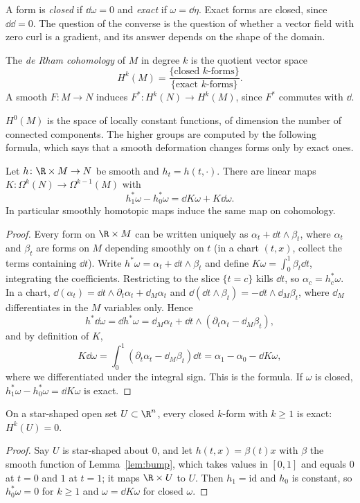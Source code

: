 A form is \emph{closed} if $\dd\omega=0$ and \emph{exact} if $\omega=\dd\eta$. Exact forms are closed, since $\dd\dd=0$. The question of the converse is the question of
whether a vector field with zero curl is a gradient, and its answer depends on the shape of the domain.

\begin{definition}
The \emph{de Rham cohomology} of $M$ in degree $k$ is the quotient vector space
\[H^k(M)=\frac{\{\text{closed }k\text{-forms}\}}{\{\text{exact }k\text{-forms}\}}.\] A smooth $F\colon M\to N$ induces
$F^*\colon H^k(N)\to H^k(M)$, since $F^*$ commutes with $\dd$.
\end{definition}

$H^0(M)$ is the space of locally constant functions, of dimension the number of connected components. The higher groups are computed by the following
formula, which says that a smooth deformation changes forms only by exact ones.

\begin{theorem}\label{thm:homotopy}
Let $h\colon\R\times M\to N$ be smooth and $h_t=h(t,\cdot)$. There are linear maps $K\colon\Omega^k(N)\to\Omega^{k-1}(M)$ with
\[
h_1^*\omega-h_0^*\omega=\dd K\omega+K\dd\omega.
\]
In particular smoothly homotopic maps induce the same map on cohomology.
\end{theorem}
\begin{proof}
Every form on $\R\times M$ can be written uniquely as $\alpha_t+\dd t\wedge\beta_t$, where $\alpha_t$ and $\beta_t$ are forms on $M$ depending smoothly on $t$ (in a chart
$(t,x)$, collect the terms containing $\dd t$). Write $h^*\omega=\alpha_t+\dd t\wedge\beta_t$ and define $K\omega=\int_0^1\beta_t\dd t$, integrating the coefficients. Restricting to
the slice $\{t=c\}$ kills $\dd t$, so $\alpha_c=h_c^*\omega$. In a chart, $\dd(\alpha_t)=\dd t\wedge\partial_t\alpha_t+\dd_M\alpha_t$ and $\dd(\dd t\wedge\beta_t)=-\dd t\wedge\dd_M\beta_t$, where $\dd_M$ differentiates
in the $M$ variables only. Hence
\[
h^*\dd\omega=\dd h^*\omega=\dd_M\alpha_t+\dd t\wedge(\partial_t\alpha_t-\dd_M\beta_t),
\]
and by definition of $K$,
\[
K\dd\omega=\int_0^1(\partial_t\alpha_t-\dd_M\beta_t)\dd t=\alpha_1-\alpha_0-\dd K\omega,
\]
where we differentiated under the integral sign. This is the formula. If $\omega$ is closed, $h_1^*\omega-h_0^*\omega=\dd K\omega$ is exact.
\end{proof}

\begin{corollary}\label{cor:poincare}
On a star-shaped open set $U\subset\R^n$, every closed $k$-form with $k\ge1$ is exact: $H^k(U)=0$.
\end{corollary}
\begin{proof}
Say $U$ is star-shaped about $0$, and let $h(t,x)=\beta(t)x$ with $\beta$ the smooth function of Lemma~\ref{lem:bump}, which takes values in $[0,1]$ and equals $0$ at
$t=0$ and $1$ at $t=1$; it maps $\R\times U$ to $U$. Then $h_1=\mathrm{id}$ and $h_0$ is constant, so $h_0^*\omega=0$ for $k\ge1$ and $\omega=\dd K\omega$ for closed $\omega$.
\end{proof}

